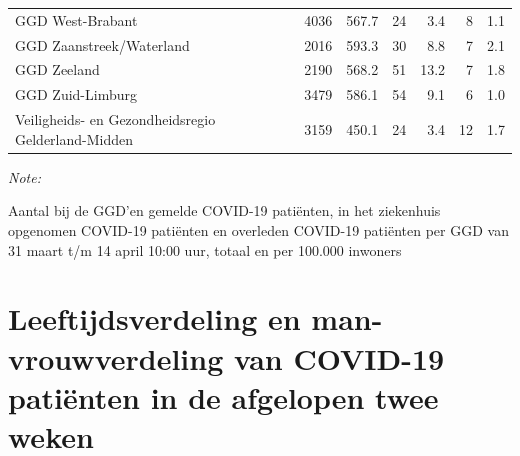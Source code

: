 \documentclass[
  english,
  man,floatsintext]{apa6}
\begin{document}
\begin{table}
\begin{threeparttable}
\begin{tabular}{lrrrrrr}
GGD West-Brabant & 4036 & 567.7 & 24 & 3.4 & 8 & 1.1\\
GGD Zaanstreek/Waterland & 2016 & 593.3 & 30 & 8.8 & 7 & 2.1\\
GGD Zeeland & 2190 & 568.2 & 51 & 13.2 & 7 & 1.8\\
GGD Zuid-Limburg & 3479 & 586.1 & 54 & 9.1 & 6 & 1.0\\
Veiligheids- en Gezondheidsregio Gelderland-Midden & 3159 & 450.1 & 24 & 3.4 & 12 & 1.7\\
\bottomrule
\end{tabular}
\begin{tablenotes}
\item \textit{Note: } 
\item Aantal bij de GGD’en gemelde COVID-19 patiënten, in het ziekenhuis opgenomen COVID-19 patiënten en overleden COVID-19 patiënten per GGD van 31 maart t/m 14 april 10:00 uur, totaal en per 100.000 inwoners
\end{tablenotes}
\end{threeparttable}
\endgroup{}
\end{table}

\newpage

\hypertarget{leeftijdsverdeling-en-man-vrouwverdeling-van-covid-19-patiuxebnten-in-de-afgelopen-twee-weken}{%
\section{Leeftijdsverdeling en man-vrouwverdeling van COVID-19 patiënten in de afgelopen twee weken}\label{leeftijdsverdeling-en-man-vrouwverdeling-van-covid-19-patiuxebnten-in-de-afgelopen-twee-weken}}
\end{document}
